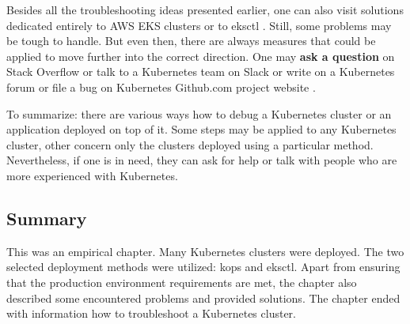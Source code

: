 Besides all the troubleshooting ideas presented earlier, one can also visit solutions dedicated entirely to AWS EKS clusters \cite{k8s-eks-tr} or to eksctl \cite{k8s-eksctl-tr}. Still, some problems may be tough to handle. But even then, there are always measures that could be applied to move further into the correct direction. One may \textbf{ask a question} on Stack Overflow or talk to a Kubernetes team on Slack or write on a Kubernetes forum or file a bug on Kubernetes Github.com project website \cite{k8s-deb-ask}.

To summarize: there are various ways how to debug a Kubernetes cluster or an application deployed on top of it. Some steps may be applied to any Kubernetes cluster, other concern only the clusters deployed using a particular method. Nevertheless, if one is in need, they can ask for help or talk with people who are more experienced with Kubernetes.

\subsection{Summary}

This was an empirical chapter. Many Kubernetes clusters were deployed. The two selected deployment methods were utilized: kops and eksctl. Apart from ensuring that the production environment requirements are met, the chapter also described some encountered problems and provided solutions. The chapter ended with information how to troubleshoot a Kubernetes cluster.
